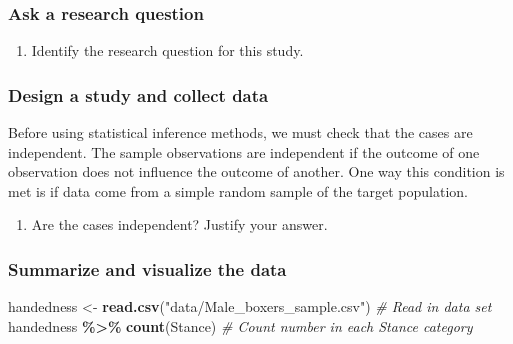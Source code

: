 \documentclass[
]{report}
\newenvironment{Shaded}{\begin{snugshade}}{\end{snugshade}}
\newcommand{\CommentTok}[1]{\textcolor[rgb]{0.56,0.35,0.01}{\textit{#1}}}
\newcommand{\KeywordTok}[1]{\textcolor[rgb]{0.13,0.29,0.53}{\textbf{#1}}}
\newcommand{\NormalTok}[1]{#1}
\newcommand{\OperatorTok}[1]{\textcolor[rgb]{0.81,0.36,0.00}{\textbf{#1}}}
\newcommand{\StringTok}[1]{\textcolor[rgb]{0.31,0.60,0.02}{#1}}
\providecommand{\tightlist}{%
  \setlength{\itemsep}{0pt}\setlength{\parskip}{0pt}}
\begin{document}
\vspace{0.5in}

\hypertarget{ask-a-research-question}{%
\subsubsection*{Ask a research question}\label{ask-a-research-question}}

\begin{enumerate}
\def\labelenumi{\arabic{enumi}.}
\setcounter{enumi}{4}
\tightlist
\item
  Identify the research question for this study.
\end{enumerate}

\vspace{1in}

\hypertarget{design-a-study-and-collect-data}{%
\subsubsection*{Design a study and collect data}\label{design-a-study-and-collect-data}}

Before using statistical inference methods, we must check that the cases are independent. The sample observations are independent if the outcome of one observation does not influence the outcome of another. One way this condition is met is if data come from a simple random sample of the target population.

\begin{enumerate}
\def\labelenumi{\arabic{enumi}.}
\setcounter{enumi}{5}
\tightlist
\item
  Are the cases independent? Justify your answer.
\end{enumerate}

\vspace{1in}

\newpage

\hypertarget{summarize-and-visualize-the-data}{%
\subsubsection*{Summarize and visualize the data}\label{summarize-and-visualize-the-data}}

\begin{Shaded}
\begin{Highlighting}[]
\NormalTok{handedness \textless{}{-}}\StringTok{ }\KeywordTok{read.csv}\NormalTok{(}\StringTok{"data/Male\_boxers\_sample.csv"}\NormalTok{) }\CommentTok{\# Read in data set}
\NormalTok{handedness }\OperatorTok{\%\textgreater{}\%}\StringTok{ }\KeywordTok{count}\NormalTok{(Stance)  }\CommentTok{\# Count number in each Stance category}
\end{Highlighting}
\end{Shaded}
\end{document}
